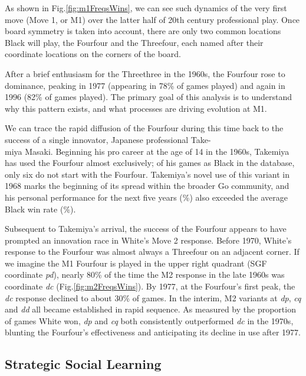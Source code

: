 \documentclass[12pt]{article}
\begin{document}
\clearpage

As shown in Fig.\;\ref{fig:m1FreqsWins}, we can see such dynamics of the very first move (Move 1, or M1) over the latter half of 20th century professional play. Once board symmetry is taken into account, there are only two common locations Black will play, the Fourfour and the Threefour, each named after their coordinate locations on the corners of the board.

After a brief enthusiasm for the Threethree in the 1960s, the Fourfour rose to dominance, peaking in 1977 (appearing in 78\% of games played) and again in 1996 (82\% of games played). The primary goal of this analysis is to understand why this pattern exists, and what processes are driving evolution at M1.

We can trace the rapid diffusion of the Fourfour during this time back to the success of a single innovator, Japanese professional Take-\\miya Masaki. Beginning his pro career at the age of 14 in the 1960s, Takemiya has used the Fourfour almost exclusively; of his \nGamesTakemiya{} games as Black in the database, only six do not start with the Fourfour. Takemiya's novel use of this variant in 1968 marks the beginning of its spread within the broader Go community, and his personal performance for the next five years (\winRateBlackTakemiya\%) also exceeded the average Black win rate (\winRateBlack\%).

Subsequent to Takemiya's arrival, the success of the Fourfour appears to have prompted an innovation race in White's Move 2 response. Before 1970, White's response to the Fourfour was almost always a Threefour on an adjacent corner. If we imagine the M1 Fourfour is played in the upper right quadrant (SGF coordinate \textit{pd}), nearly 80\% of the time the M2 response in the late 1960s was coordinate \textit{dc} (Fig.\;\ref{fig:m2FreqsWins}). By 1977, at the Fourfour's first peak, the \textit{dc} response declined to about 30\% of games. In the interim, M2 variants at \textit{dp}, \textit{cq} and \textit{dd} all became established in rapid sequence. As measured by the proportion of games White won, \textit{dp} and \textit{cq} both consistently outperformed \textit{dc} in the 1970s, blunting the Fourfour's effectiveness and anticipating its decline in use after 1977.

\subsection{Strategic Social Learning}
\end{document}
